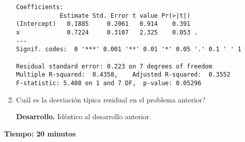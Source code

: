 \documentclass[11pt,oneside,spanish]{article}
\theoremstyle{definition}
\theoremstyle{definition}\newtheorem{definicion}{Definicin}
\theoremstyle{definition}\newtheorem{ejemplo}{Ejemplo}
\theoremstyle{remark}\newtheorem{nota}{\textsc{Nota}}
\theoremstyle{definition}\newtheorem{proposicion}{Proposicin}
\theoremstyle{definition}\newtheorem{problema}{Problema}
\begin{document}
\begin{enumerate}[(1)]
\begin{lstlisting}[backgroundcolor=\color{Gray!20},frame=none,basicstyle=\ttfamily]
Coefficients:
            Estimate Std. Error t value Pr(>|t|)  
(Intercept)   0.1885     0.2061   0.914    0.391  
x             0.7224     0.3107   2.325    0.053 .
---
Signif. codes:  0 '***' 0.001 '**' 0.01 '*' 0.05 '.' 0.1 ' ' 1

Residual standard error: 0.223 on 7 degrees of freedom
Multiple R-squared:  0.4358,	Adjusted R-squared:  0.3552 
F-statistic: 5.408 on 1 and 7 DF,  p-value: 0.05296
\end{lstlisting}
	
\item {\textquestiondown}Cu\'al es la desviaci\'on t\'ipica residual en el problema anterior?

\textbf{Desarrollo.}
Id\'entico al desarrollo anterior.

\end{enumerate}

\bigskip

\textbf{Tiempo: 20 minutos}
\end{document}
